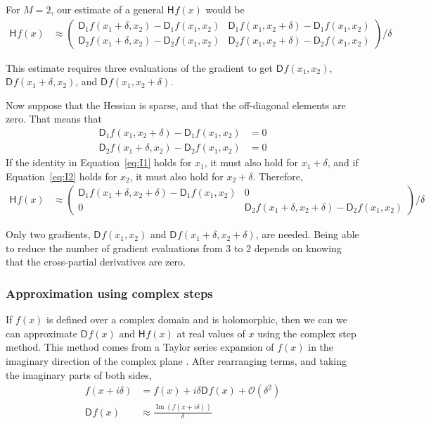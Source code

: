 \documentclass[jss]{jss}\usepackage[]{graphicx}\usepackage[]{color}
\newcommand{\parD}[3]{\mathsf{D}^{#1}_{#2}#3}
\newcommand{\hess}[2]{\mathsf{H}_{#1}#2}
\DeclareMathOperator{\Imag}{Im}
\begin{document}
For $M=2$, our estimate of a general $\hess{}{f(x)}$ would be
\begin{align}
  \label{eq:FDhess2}
  \hess{}{f(x)}&\approx
  \begin{pmatrix}
    \parD{}{1}{f(x_1+\delta, x_2)}-\parD{}{1}{f(x_1,x_2)}& \parD{}{1}{f(x_1,x_2+\delta)}-\parD{}{1}{f(x_1,x_2)}\\
        \parD{}{2}{f(x_1+\delta, x_2)}-\parD{}{2}{f(x_1,x_2)}&  \parD{}{2}{f(x_1,x_2+\delta)}-\parD{}{2}{f(x_1,x_2)}
    \end{pmatrix}/\delta
\end{align}

This estimate requires three evaluations of the gradient to get
${\parD{}{}{f(x_1,x_2)}}$, ${\parD{}{}{f(x_1+\delta,x_2)}}$, and
${\parD{}{}{f(x_1,x_2+\delta)}}$.

Now suppose that the Hessian is sparse, and that the off-diagonal
elements are zero.  That means that
\begin{align}
  \parD{}{1}{f(x_1,x_2+\delta)}-\parD{}{1}{f(x_1,x_2)}&=0\label{eq:I1}\\
    \parD{}{2}{f(x_1+\delta,x_2)}-\parD{}{2}{f(x_1,x_2)}&=0\label{eq:I2}
\end{align}
If the identity in Equation~\ref{eq:I1} holds for $x_1$, it must also
hold for $x_1+\delta$, and if Equation~\ref{eq:I2} holds for $x_2$, it
must also hold for $x_2+\delta$.  Therefore,
\begin{align}
  \label{eq:FDhess2sp}
  \hess{}{f(x)}&\approx
  \begin{pmatrix}
    \parD{}{1}{f(x_1+\delta, x_2+\delta)}-\parD{}{1}{f(x_1,x_2)}&0\\
        0&  \parD{}{2}{f(x_1+\delta,x_2+\delta)}-\parD{}{2}{f(x_1,x_2)}
    \end{pmatrix}/\delta
\end{align}

Only two gradients,
${\parD{}{}{f(x_1,x_2)}}$ and ${\parD{}{}{f(x_1+\delta,x_2+\delta)}}$,
are needed.
Being able to reduce the number of gradient evaluations from 3 to 2 depends on knowing that
the cross-partial derivatives are zero.

\subsubsection[Approximation using complex steps]{Approximation using complex steps}

If $f(x)$ is defined over a complex domain and is holomorphic, then we
can we can approximate $\parD{}{}{f(x)}$
and $\hess{}{f(x)}$ at real values of $x$ using the complex step
method. This method comes from a Taylor
series expansion of $f(x)$ in the imaginary direction of the complex
plane \citep{SquireTrapp1998}.  After rearranging terms, and taking the imaginary
parts of both sides,
\begin{align}
  \label{eq:complexTaylor}
  f(x+i\delta)&=f(x) + i\delta\parD{}{}{f(x)}+\mathcal{O}(\delta^2)\\
  \parD{}{}{f(x)}&\approx\frac{\Imag(f(x+i\delta))}{\delta}
\end{align}
\end{document}
